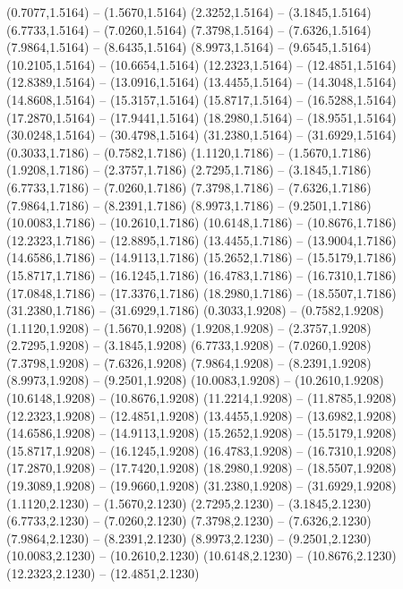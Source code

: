 {\begin{scope}[shift={(#1,#2)}]
    (0.7077,1.5164) -- (1.5670,1.5164)
    (2.3252,1.5164) -- (3.1845,1.5164)
    (6.7733,1.5164) -- (7.0260,1.5164)
    (7.3798,1.5164) -- (7.6326,1.5164)
    (7.9864,1.5164) -- (8.6435,1.5164)
    (8.9973,1.5164) -- (9.6545,1.5164)
    (10.2105,1.5164) -- (10.6654,1.5164)
    (12.2323,1.5164) -- (12.4851,1.5164)
    (12.8389,1.5164) -- (13.0916,1.5164)
    (13.4455,1.5164) -- (14.3048,1.5164)
    (14.8608,1.5164) -- (15.3157,1.5164)
    (15.8717,1.5164) -- (16.5288,1.5164)
    (17.2870,1.5164) -- (17.9441,1.5164)
    (18.2980,1.5164) -- (18.9551,1.5164)
    (30.0248,1.5164) -- (30.4798,1.5164)
    (31.2380,1.5164) -- (31.6929,1.5164)
    (0.3033,1.7186) -- (0.7582,1.7186)
    (1.1120,1.7186) -- (1.5670,1.7186)
    (1.9208,1.7186) -- (2.3757,1.7186)
    (2.7295,1.7186) -- (3.1845,1.7186)
    (6.7733,1.7186) -- (7.0260,1.7186)
    (7.3798,1.7186) -- (7.6326,1.7186)
    (7.9864,1.7186) -- (8.2391,1.7186)
    (8.9973,1.7186) -- (9.2501,1.7186)
    (10.0083,1.7186) -- (10.2610,1.7186)
    (10.6148,1.7186) -- (10.8676,1.7186)
    (12.2323,1.7186) -- (12.8895,1.7186)
    (13.4455,1.7186) -- (13.9004,1.7186)
    (14.6586,1.7186) -- (14.9113,1.7186)
    (15.2652,1.7186) -- (15.5179,1.7186)
    (15.8717,1.7186) -- (16.1245,1.7186)
    (16.4783,1.7186) -- (16.7310,1.7186)
    (17.0848,1.7186) -- (17.3376,1.7186)
    (18.2980,1.7186) -- (18.5507,1.7186)
    (31.2380,1.7186) -- (31.6929,1.7186)
    (0.3033,1.9208) -- (0.7582,1.9208)
    (1.1120,1.9208) -- (1.5670,1.9208)
    (1.9208,1.9208) -- (2.3757,1.9208)
    (2.7295,1.9208) -- (3.1845,1.9208)
    (6.7733,1.9208) -- (7.0260,1.9208)
    (7.3798,1.9208) -- (7.6326,1.9208)
    (7.9864,1.9208) -- (8.2391,1.9208)
    (8.9973,1.9208) -- (9.2501,1.9208)
    (10.0083,1.9208) -- (10.2610,1.9208)
    (10.6148,1.9208) -- (10.8676,1.9208)
    (11.2214,1.9208) -- (11.8785,1.9208)
    (12.2323,1.9208) -- (12.4851,1.9208)
    (13.4455,1.9208) -- (13.6982,1.9208)
    (14.6586,1.9208) -- (14.9113,1.9208)
    (15.2652,1.9208) -- (15.5179,1.9208)
    (15.8717,1.9208) -- (16.1245,1.9208)
    (16.4783,1.9208) -- (16.7310,1.9208)
    (17.2870,1.9208) -- (17.7420,1.9208)
    (18.2980,1.9208) -- (18.5507,1.9208)
    (19.3089,1.9208) -- (19.9660,1.9208)
    (31.2380,1.9208) -- (31.6929,1.9208)
    (1.1120,2.1230) -- (1.5670,2.1230)
    (2.7295,2.1230) -- (3.1845,2.1230)
    (6.7733,2.1230) -- (7.0260,2.1230)
    (7.3798,2.1230) -- (7.6326,2.1230)
    (7.9864,2.1230) -- (8.2391,2.1230)
    (8.9973,2.1230) -- (9.2501,2.1230)
    (10.0083,2.1230) -- (10.2610,2.1230)
    (10.6148,2.1230) -- (10.8676,2.1230)
    (12.2323,2.1230) -- (12.4851,2.1230)

\end{scope}}
